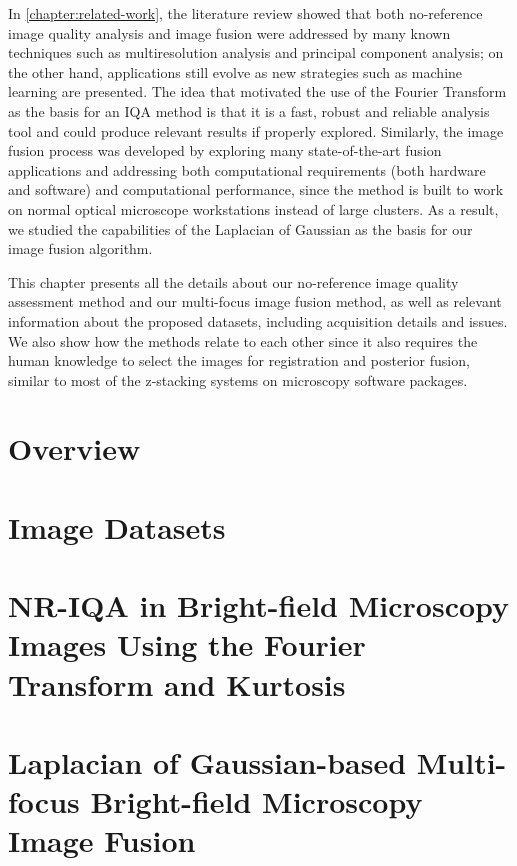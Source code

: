 In \autoref{chapter:related-work}, the literature review showed that both no-reference image quality analysis and image fusion were addressed by many known techniques such as multiresolution analysis and principal component analysis; on the other hand, applications still evolve as new strategies such as machine learning are presented. The idea that motivated the use of the Fourier Transform as the basis for an IQA method is that it is a fast, robust and reliable analysis tool and could produce relevant results if properly explored. Similarly, the image fusion process was developed by exploring many state-of-the-art fusion applications and addressing both computational requirements (both hardware and software) and computational performance, since the method is built to work on normal optical microscope workstations instead of large clusters. As a result, we studied the capabilities of the Laplacian of Gaussian as the basis for our image fusion algorithm. 

This chapter presents all the details about our no-reference image quality assessment method and our multi-focus image fusion method, as well as relevant information about the proposed datasets, including acquisition details and issues. We also show how the methods relate to each other since it also requires the human knowledge to select the images for registration and posterior fusion, similar to most of the z-stacking systems on microscopy software packages.

\section{Overview}


\section{Image Datasets}


\section{NR-IQA in Bright-field Microscopy Images Using the Fourier Transform and Kurtosis}


\section{Laplacian of Gaussian-based Multi-focus Bright-field Microscopy Image Fusion}
